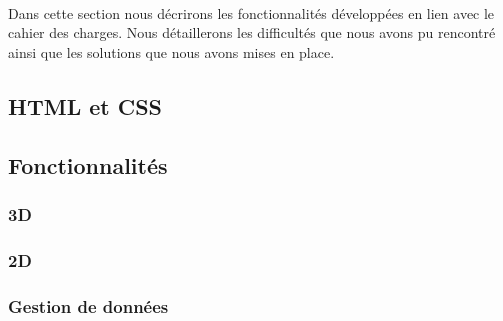 \documentclass{scrartcl}
\begin{document}
\paragraph{}
Dans cette section nous décrirons les fonctionnalités développées en lien avec le cahier des charges. Nous détaillerons les difficultés que nous avons pu rencontré ainsi que les solutions que nous avons mises en place.

\subsection{HTML et CSS}
\paragraph{}

\subsection{Fonctionnalités}
\paragraph{}

\subsubsection{3D}
\paragraph{}

\subsubsection{2D}
\paragraph{}

\subsubsection{Gestion de données}
\paragraph{}
\end{document}
